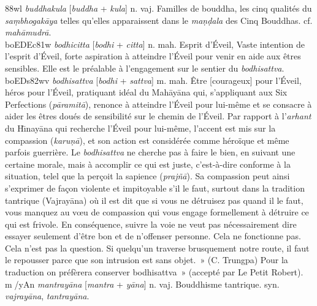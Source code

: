 \documentclass[a4paper,11pt,twocolumn]{article}
\begin{document}
{\dn {}\388wl} {\em buddhakula} [{\em buddha} + {\em kula}]
n. vaj. \og Familles de bouddha\fg, les cinq qualités du {\em
sa\d{m}bhogak\={a}ya} telles qu'elles apparaissent dans le {\em
ma\d{n}\d{d}ala} des Cinq Bouddhas. cf. {\em
mah\={a}mudr\={a}}. \\

{\dn boEDEc\381w} {\em bodhicitta} [{\em bodhi} + {\em citta}]
n. mah. \og Esprit d'Éveil\fg, \og Vaste intention de l'esprit d'Éveil\fg,
forte aspiration à atteindre l'Éveil pour venir en aide aux êtres
sensibles. Elle est le préalable à l'engagement sur le sentier du {\em
bodhisattva}. \\

{\dn boEDs\382wv} {\em bodhisattva} [{\em bodhi} + {\em sattva}]
m. mah. \og Être [courageux] pour l'Éveil, héros pour l'Éveil\fg, pratiquant
idéal du Mah\={a}y\={a}na qui, s'appliquant aux Six Perfections
({\em p\={a}ramit\={a}}), renonce à atteindre l'Éveil pour
lui-même et se consacre à aider les êtres doués de sensibilité sur le
chemin de l'Éveil. Par rapport à l'{\em arhant} du
H\={\i}nay\={a}na qui recherche l'Éveil pour lui-même, l'accent
est mis sur la compassion ({\em karu\d{n}\={a}}), et son action est
considérée comme héroïque et même parfois guerrière. Le {\em bodhisattva} ne
cherche pas à \og faire le bien\fg, en suivant une certaine morale, mais
à accomplir ce qui est juste, c'est-à-dire conforme à la situation,
telel que la per\c{c}oit la sapience ({\em praj\~{n}\={a}}). Sa
compassion peut ainsi s'exprimer de fa\c{c}on violente et impitoyable
s'il le faut, surtout dans la tradition tantrique (Vajray\={a}na) où il est
dit que \og si vous ne détruisez pas quand il le faut, vous manquez au
v{\oe}u de compassion qui vous engage formellement à détruire ce qui
est frivole. En conséquence, suivre la voie ne veut pas nécessairement
dire essayer seulement d'être bon et de n'offenser personne. Cela ne
fonctionne pas. Cela n'est pas la question. Si quelqu'un traverse
brusquement notre route, il faut le repousser parce que son intrusion
est sans objet.~» (C. Trungpa) Pour la traduction on préfèrera conserver
\og bodhisattva~» (accepté par Le Petit Robert). \\



{\dn m^^F/yAn} {\em mantray\={a}na} [{\em mantra} + {\em y\={a}na}]
n. vaj. Bouddhisme tantrique. syn. {\em vajray\={a}na},
{\em tantray\={a}na}. \\
\end{document}
